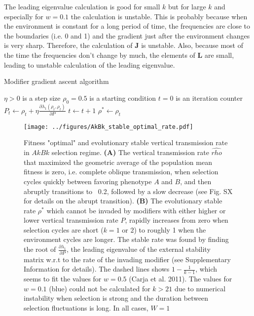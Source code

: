 \documentclass[11pt, oneside]{article}   	%
\let\vec\mathbf
\begin{document}
The leading eigenvalue calculation is good for small $k$ but for large $k$ and especially for $w=0.1$ the calculation is unstable.
This is probably because when the environment is constant for a long period of time, the frequencies are close to the boundaries (i.e. 0 and 1) and the gradient just after the environment changes is very sharp.
Therefore, the calculation of $\vec{J}$ is unstable.
Also, because most of the time the frequencies don't change by much, the elements of $\vec{L}$ are small, leading to unstable calculation of the leading eigenvalue.
\\

\begin{algorithm} 
\caption{Modifier gradient ascent algorithm}\label{algorithm}
\begin{algorithmic}[1]
\State $\eta > 0$ is a step size
\State $\rho_{0} = 0.5$ is a starting condition
\State $t = 0$ is an iteration counter
	\State $P_{t} \gets \rho_{t} + \eta \frac{\partial \lambda_1(\rho_{t}, \rho_{t})}{\partial P}$
	\Else
	\EndIf
	\State $t \gets t+1$
\EndWhile
\State $\rho^* \gets \rho_t$
\end{algorithmic}
\end{algorithm}

\begin{figure}[htbp]
  \centering
    \texttt{[image: ../figures/AkBk\_stable\_optimal\_rate.pdf]}
  \caption{Fitness "optimal" and evolutionary stable vertical transmission rate in $AkBk$ selection regime. \textbf{(A)} The vertical transmission rate $\hat{rho}$ that maximized the geometric average of the population mean fitness is zero, i.e. complete oblique transmission, when selection cycles quickly between favoring phenotype $A$ and $B$, and then abruptly transitions to ~0.2, followed by a slow decrease (see Fig. SX for details on the abrupt transition). 
  \textbf{(B)} The evolutionary stable rate $\rho^*$ which cannot be invaded by modifiers with either higher or lower vertical transmission rate $P$, rapidly increases from zero when selection cycles are short ($k=1$ or $2$) to roughly 1 when the environment cycles are longer. The stable rate was found by finding the root of $\frac{\partial \lambda_1}{\partial P}$, the leading eigenvalue of the external stability matrix w.r.t to the rate of the invading modifier (see Supplementary Information for details). The dashed lines shows $1-\frac{1}{k-1}$, which seems to fit the values for $w=0.5$ (Carja et al. 2011). The values for $w=0.1$ (blue) could not be calculated for $k>21$ due to numerical instability when selection is strong and the duration between selection fluctuations is long.
  In all cases, $W=1$}
  \label{fig:AkBk_stable_modifier_w_0.1}
\end{figure}
\end{document}
